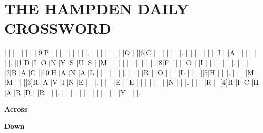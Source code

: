 \documentclass{article}
\begin{document}
\begin{minipage}{\textwidth}

\section*{THE HAMPDEN DAILY CROSSWORD}

\begin{Puzzle}{14}{11}
  |{}   |{} |{}   |{}   |{} |{}    |{} |[9]P |{}   |{}   |{} |{} |{} |{}   |{} |{} |. %
  |{}   |{} |{}   |{}   |{} |{}    |{} |O    |{}   |[6]C |{} |{} |{} |{}   |{} |{} |. %
  |{}   |{} |{}   |{}   |{} |{}    |{} |I    |{}   |A    |{} |{} |{} |{}   |{} |{} |. %
  |[1]D |I  |O    |N    |Y  |S     |U  |S    |{}   |M    |{} |{} |{} |{}   |{} |{} |. %
  |{}   |{} |{}   |[8]F |{} |{}    |{} |O    |{}   |I    |{} |{} |{} |{}   |{} |{} |. %
  |{}   |{} |[2]B |A    |C  |[10]H |A  |N    |A    |L    |{} |{} |{} |{}   |{} |{} |. %
  |{}   |{} |{}   |R    |{} |O     |{} |{}   |{}   |L    |{} |{} |{} |[5]H |{} |{} |. %
  |{}   |{} |{}   |M    |{} |M     |{} |{}   |[3]R |A    |V  |I  |N  |E    |{} |{} |. %
  |{}   |{} |{}   |E    |{} |E     |{} |{}   |{}   |{}   |{} |{} |{} |N    |{} |{} |. %
  |{}   |{} |{}   |R    |{} |[4]R  |I  |C    |H    |A    |R  |D  |{} |R    |{} |{} |. %
  |{}   |{} |{}   |{}   |{} |{}    |{} |{}   |{}   |{}   |{} |{} |{} |Y    |{} |{} |. %
\end{Puzzle}

\begin{PuzzleClues}{\textbf{Across}}
\end{PuzzleClues}

\begin{PuzzleClues}{\textbf{Down}}
\end{PuzzleClues}

\end{minipage}
\end{document}

